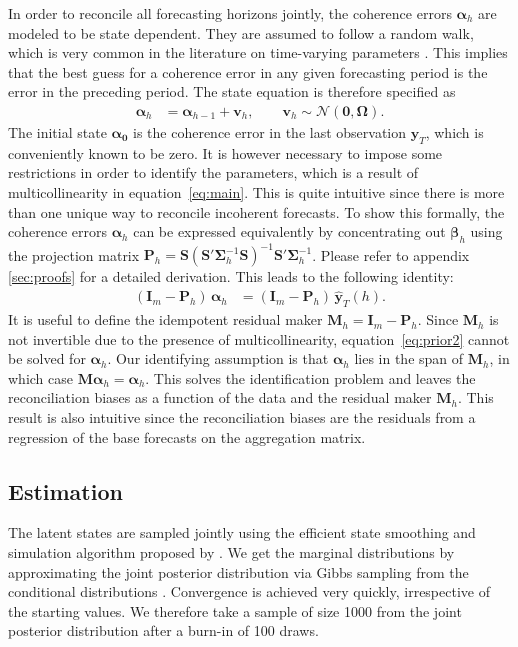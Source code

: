 \documentclass[a4paper,fleqn,11pt]{article}
\begin{document}
In order to reconcile all forecasting horizons jointly, the coherence errors $\boldsymbol{\alpha}_h$ are modeled to be state dependent. They are assumed to follow a random walk, which is very common in the literature on time-varying parameters \citep[see for instance][and references therein]{Primiceri2005}. This implies that the best guess for a coherence error in any given forecasting period is the error in the preceding period. The state equation is therefore specified as
\begin{align}
	\label{eq:state}
	\boldsymbol{\alpha}_h & = \boldsymbol{\alpha}_{h-1} + \textbf{v}_h, \qquad \textbf{v}_h \sim \mathcal{N}(\textbf{0}, \boldsymbol{\Omega}).
\end{align}
The initial state $\boldsymbol{\alpha_0}$ is the coherence error in the last observation $\textbf{y}_{T}$, which is conveniently known to be zero. It is however necessary to impose some restrictions in order to identify the parameters, which is a result of multicollinearity in equation~\eqref{eq:main}. This is quite intuitive since there is more than one unique way to reconcile incoherent forecasts. To show this formally, the coherence errors $\boldsymbol{\alpha}_h$ can be expressed equivalently by concentrating out $\boldsymbol{\beta}_h$ using the projection matrix $\textbf{P}_h = \textbf{S}(\textbf{S}'\boldsymbol{\Sigma}_h^{-1} \textbf{S})^{-1}\textbf{S}'\boldsymbol{\Sigma}_h^{-1}$. Please refer to appendix \ref{sec:proofs} for a detailed derivation. This leads to the following identity:
\begin{align}
	\label{eq:prior2}
	(\textbf{I}_m - \textbf{P}_h)\, \boldsymbol{\alpha}_h &= (\textbf{I}_m - \textbf{P}_h)\, \mathbf{\hat{y}}_{T}(h).
\end{align}
It is useful to define the idempotent residual maker $\textbf{M}_h = \textbf{I}_m - \textbf{P}_h$. Since $\textbf{M}_h$ is not invertible due to the presence of multicollinearity, equation~\eqref{eq:prior2} cannot be solved for $\boldsymbol{\alpha}_h$. Our identifying assumption is that $\boldsymbol{\alpha}_h$ lies in the span of $\textbf{M}_h$, in which case $\textbf{M}\boldsymbol{\alpha}_h = \boldsymbol{\alpha}_h$. This solves the identification problem and leaves the reconciliation biases as a function of the data and the residual maker $\textbf{M}_h$. This result is also intuitive since the reconciliation biases are the residuals from a regression of the base forecasts on the aggregation matrix.


\subsection{Estimation}\label{sec:estim}
The latent states are sampled jointly using the efficient state smoothing and simulation algorithm proposed by \cite{Chan2009}. We get the marginal distributions by approximating the joint posterior distribution via Gibbs sampling from the conditional distributions \citep{Ando2010}. Convergence is achieved very quickly, irrespective of the starting values. We therefore take a sample of size 1000 from the joint posterior distribution after a burn-in of 100 draws.
\end{document}
